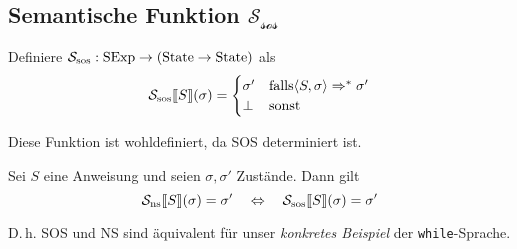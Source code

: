 \subsection{Semantische Funktion $\mathcal{S_{\text{sos}}}$}

\begin{definition}
    Definiere $\mathcal{S_{\text{sos}}}: \operatorname{SExp} \to (\operatorname{State} \to \operatorname{State})$ als
    \[
        \mathcal{S_{\text{sos}}}\mathrm{[}\kern-.14em\mathrm{[} S \mathrm{]}\kern-.14em\mathrm{]}(\sigma) = \begin{cases}
            \sigma' & \text{falls} \langle S, \sigma \rangle \Rightarrow^* \sigma' \\
            \bot & \text{sonst}
        \end{cases}
    \]

    Diese Funktion ist wohldefiniert, da SOS determiniert ist.
\end{definition}

\begin{theorem}
    Sei $S$ eine Anweisung und seien $\sigma, \sigma'$ Zustände. Dann gilt
    \[
        \mathcal{S_{\text{ns}}}\mathrm{[}\kern-.14em\mathrm{[} S \mathrm{]}\kern-.14em\mathrm{]}(\sigma) = \sigma'
        \quad\Leftrightarrow\quad
        \mathcal{S_{\text{sos}}}\mathrm{[}\kern-.14em\mathrm{[} S \mathrm{]}\kern-.14em\mathrm{]}(\sigma) = \sigma'
    \]

    D.\,h. SOS und NS sind äquivalent für unser \emph{konkretes Beispiel} der \texttt{while}-Sprache.
\end{theorem}

